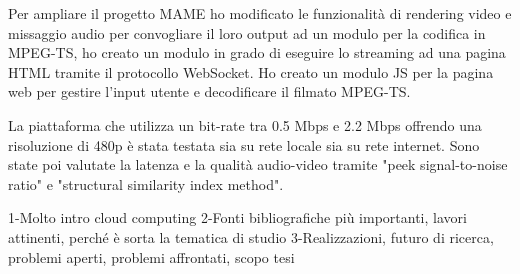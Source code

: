 Per ampliare il progetto MAME ho modificato le funzionalità di rendering video e missaggio audio per convogliare il loro output ad un modulo per la codifica in MPEG-TS, ho creato un modulo in grado di eseguire lo streaming ad una pagina HTML tramite il protocollo WebSocket. Ho creato un modulo JS per la pagina web per gestire l'input utente e decodificare il filmato MPEG-TS.

La piattaforma che utilizza un bit-rate tra 0.5 Mbps e 2.2 Mbps offrendo una risoluzione di 480p è stata testata sia su rete locale sia su rete internet. Sono state poi valutate la latenza e la qualità audio-video tramite "peek signal-to-noise ratio" e "structural similarity index method".



1-Molto intro cloud computing
2-Fonti bibliografiche più importanti, lavori attinenti, perché è sorta la tematica di studio
3-Realizzazioni, futuro di ricerca, problemi aperti, problemi affrontati, scopo tesi


